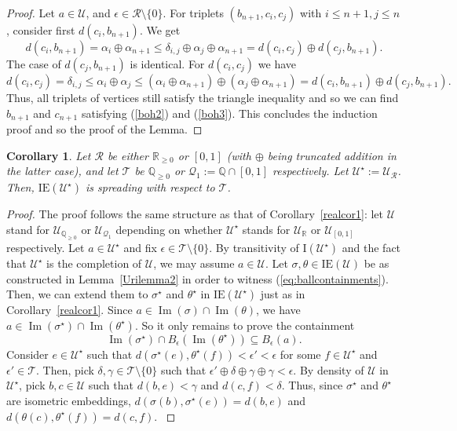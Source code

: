 \documentclass{article}
\newtheorem{corollary}[theorem]{Corollary}
\theoremstyle{remark}
\theoremstyle{definition}
\newcommand{\U}[0]{\mathbb{U}}
\renewcommand{\U}[0]{\mathcal{U}}
\DeclareMathOperator{\im}{Im}
\renewcommand\leq{\leqslant}
\renewcommand\geq{\geqslant}
\newcommand{\rr}[0]{\mathcal{R}}
\newcommand{\ie}[0]{\mathrm{IE}}
\begin{document}
{{{{{\begin{proof} {Let $a\in\U$, and  $\epsilon\in \rr\setminus\{0\}$.}
For triplets $(b_{n+1}, c_i, c_j)$ with $i\leq n+1, j\leq n$, consider first $d(c_i, b_{n+1})$. We get
\[d(c_i, b_{n+1})=\alpha_i\oplus \alpha_{n+1}\leq \delta_{i,j}\oplus\alpha_j\oplus\alpha_{n+1}=d(c_i, c_j)\oplus d(c_j, b_{n+1}).\]
The case of $d(c_j, b_{n+1})$ is identical.
For $d(c_i, c_j)$ we have
\[d(c_i, c_j)=\delta_{i,j}\leq \alpha_i\oplus\alpha_j\leq (\alpha_i\oplus\alpha_{n+1})\oplus (\alpha_j\oplus \alpha_{n+1})=d(c_i, b_{n+1})\oplus d(c_j, b_{n+1}).\]
Thus, all triplets of vertices still satisfy the triangle inequality and so we can find $b_{n+1}$ and $c_{n+1}$ satisfying (\ref{boh2}) and (\ref{boh3}). This concludes the induction proof and so the proof of the Lemma.
\end{proof}

\begin{corollary} \label{realcor2} Let $\rr$ be either $\mathbb{R}_{\geq 0}$ or $[0,1]$ (with $\oplus$ being truncated addition in the latter case), and let $\mathcal{T}$ be $\mathbb{Q}_{\geq 0}$ or $\mathcal{Q}_1:=\mathbb{Q}\cap[0,1]$ respectively. Let $\U^\star:=\U_{\rr}$. Then, $\ie(\U^\star)$ is spreading with respect to $\mathcal{T}$.
\end{corollary}
\begin{proof}
    The proof follows the same structure as that of Corollary~\ref{realcor1}: let $\U$ stand for $\U_{\mathbb{Q}_{\geq 0}}$ or $\U_{\mathcal{Q}_1}$ depending on whether $\U^\star$ stands for $\U_\mathbb{R}$ or $\U_{[0,1]}$ respectively. 
    {Let $a\in\U^\star$ and fix $\epsilon\in \mathcal T\setminus\{0\}$. By transitivity of $\mathrm{I}(\U^\star)$ and the fact that $\U^\star$ is the completion of $\U$, we may assume $a\in \U$. Let $\sigma, \theta\in \mathrm{IE}(\U)$ be as constructed in Lemma~\ref{Urilemma2} in order to witness (\ref{eq:ballcontainments}). Then, we can extend them to $\sigma^\star$ and $\theta^\star$ in $\mathrm{IE}(\U^\star)$ just as in Corollary~\ref{realcor1}. Since $a\in\im(\sigma)\cap \im(\theta)$, we have $a\in\im(\sigma^\star)\cap \im(\theta^\star)$. So it only remains to prove the containment
    \[\im(\sigma^\star)\cap B_\epsilon(\im(\theta^\star))\subseteq B_\epsilon(a).\]
    Consider $e\in\U^\star$ such that  $d(\sigma^\star(e), \theta^\star(f))<\epsilon'<\epsilon$ for some $f\in \U^\star$ and $\epsilon'\in \mathcal T$. }
    Then, pick $\delta, \gamma\in \mathcal{T}\setminus\{0\}$ such that $\epsilon'\oplus\delta\oplus\gamma\oplus\gamma<\epsilon$. 
    By density of $\U$ in $\U^\star$, pick $b,c\in \U$ such that {$d(b,e)<\gamma$ and $d(c,f)< \delta$.}
    Thus, since $\sigma^\star$ and $\theta^\star$ are isometric embeddings, {$d(\sigma(b), \sigma^\star(e))=d(b,e)$ and $d(\theta(c), \theta^\star(f))=d(c,f)$. }

\end{proof}}}}}}
\end{document}
